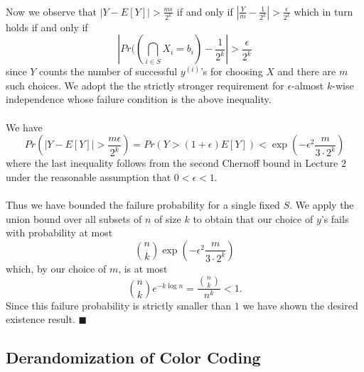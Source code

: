 \documentclass[letterpaper,12pt,oneside,onecolumn]{article}
\begin{document}
\paragraph{}
Now we observe that $|Y- E[Y]| > \frac{m\epsilon}{2^k}$ if and only if $|\frac{Y}{m} - \frac{1}{2^k}| > \frac{\epsilon}{2^k}$ which in turn holds if and only if $$|Pr((\bigcap_{i\in S} X_i = b_i) - \frac{1}{2^k}|>\frac{\epsilon}{2^k}$$
since $Y$ counts the number of successful $y^(i)$'s for choosing $X$ and there are $m$ such choices. We adopt the the strictly stronger requirement for $\epsilon$-almost $k$-wise independence whose failure condition is the above inequality.
\paragraph{}
We have
$$Pr(|Y-E[Y]| > \frac{m\epsilon}{2^k}) =  Pr(Y > (1+\epsilon)E[Y]) < \exp(-\epsilon^2\frac{m}{3\cdot2^k})$$
where the last inequality follows from the second Chernoff bound in Lecture $2$ under the reasonable assumption that $0 < \epsilon < 1$.
\paragraph{}
Thus we have bounded the failure probability for a single fixed $S$. We apply the union bound over all subsets of $n$ of size $k$ to obtain that our choice of $y$'s fails with probability at most
$${n\choose k} \exp(-\epsilon^2\frac{m}{3\cdot2^k})$$
which, by our choice of $m$, is at most
$${n\choose k} e^{-k\log n} = \frac{{n\choose k}}{n^k} < 1.$$
Since this failure probability is strictly smaller than $1$ we have shown the desired existence result. $\blacksquare$
\subsection{Derandomization of Color Coding}
\end{document}
